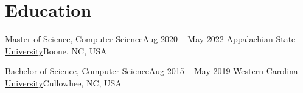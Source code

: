 \section{Education}
\mySubHeadingListStart

  \mySubHeading
    {Master of Science, Computer Science}{Aug 2020 -- May 2022}
    { \href{https://www.appstate.edu}{Appalachian State University}}{Boone, NC, USA}
    \myItemListStart
    \myItemListEnd

  \mySubHeading
    {Bachelor of Science, Computer Science}{Aug 2015 -- May 2019}
    { \href{https://www.wcu.edu}{Western Carolina University}}{Cullowhee, NC, USA}
    \myItemListStart
    \myItemListEnd

\mySubHeadingListEnd
